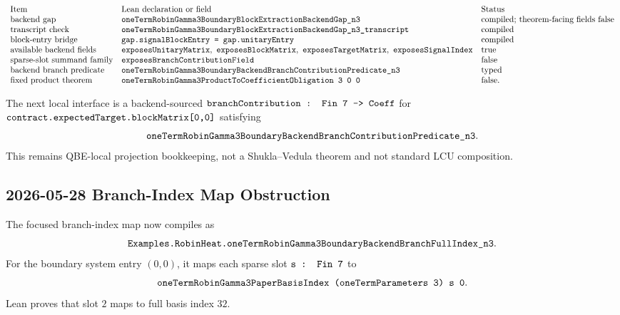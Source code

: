 \[
\begin{array}{lll}
\text{Item} & \text{Lean declaration or field} & \text{Status}\\
\text{backend gap} &
\Lean{oneTermRobinGamma3BoundaryBlockExtractionBackendGap\_n3} &
\text{compiled; theorem-facing fields false}\\
\text{transcript check} &
\Lean{oneTermRobinGamma3BoundaryBlockExtractionBackendGap\_n3\_transcript} &
\text{compiled}\\
\text{block-entry bridge} &
\Lean{gap.signalBlockEntry = gap.unitaryEntry} &
\text{compiled}\\
\text{available backend fields} &
\Lean{exposesUnitaryMatrix},\ \Lean{exposesBlockMatrix},\ \Lean{exposesTargetMatrix},\ \Lean{exposesSignalIndex} &
\text{true}\\
\text{sparse-slot summand family} &
\Lean{exposesBranchContributionField} &
\text{false}\\
\text{backend branch predicate} &
\Lean{oneTermRobinGamma3BoundaryBackendBranchContributionPredicate\_n3} &
\text{typed}\\
\text{fixed product theorem} &
\Lean{oneTermRobinGamma3ProductToCoefficientObligation\ 3\ 0\ 0} &
\text{false}.
\end{array}
\]

The next local interface is a backend-sourced
\(\texttt{branchContribution : Fin 7 -> Coeff}\) for
\(\texttt{contract.expectedTarget.blockMatrix[0,0]}\) satisfying
\[
  \texttt{oneTermRobinGamma3BoundaryBackendBranchContributionPredicate\_n3}.
\]
This remains QBE-local projection bookkeeping, not a Shukla--Vedula theorem and
not standard LCU composition.

\subsection{2026-05-28 Branch-Index Map Obstruction}

The focused branch-index map now compiles as
\[
  \texttt{Examples.RobinHeat.oneTermRobinGamma3BoundaryBackendBranchFullIndex\_n3}.
\]
For the boundary system entry \((0,0)\), it maps each sparse slot
\(\texttt{s : Fin 7}\) to
\[
  \texttt{oneTermRobinGamma3PaperBasisIndex (oneTermParameters 3) s 0}.
\]
Lean proves that slot \(2\) maps to full basis index \(32\).

